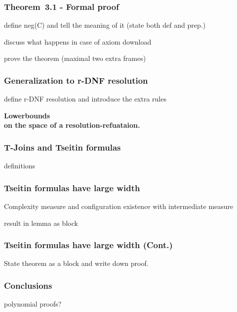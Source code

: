 \documentclass[t,usenames,dvipsnames]{beamer}
\begin{document}
\begin{frame}\frametitle{Theorem~3.1 - Formal proof}
	define neg(C) and tell the meaning of it  (state both def and prep.)

	discuss what happens in case of axiom download

	prove the theorem (maximal two extra frames)
\end{frame}

\begin{frame}\frametitle{Generalization to r-DNF resolution}
	define r-DNF resolution and introduce the extra rules
\end{frame}

\begin{frame}[c]
	\color{NavyBlue} \centering \Large \textbf{
	Lowerbounds\\on the space of a resolution-refuataion.}
\end{frame}

\begin{frame} \frametitle{T-Joins and Tseitin formulas}
	definitions
\end{frame}

\begin{frame} \frametitle{Tseitin formulas have large width}
	Complexity measure and configuration existence with intermediate measure

	result in lemma  as block
\end{frame}

\begin{frame} \frametitle{Tseitin formulas have large width (Cont.)}
	State theorem as a block and write down proof.
\end{frame}

\begin{frame} \frametitle{Conclusions}
polynomial proofs?	
\end{frame}
\end{document}
